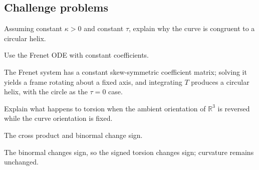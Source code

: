 \subsection*{Challenge problems}

\begin{exercise}\label{exr:vii13-ped-15}
Assuming constant \(\kappa>0\) and constant \(\tau\), explain why the curve is congruent to a circular helix.
\end{exercise}
\begin{hint}
Use the Frenet ODE with constant coefficients.
\end{hint}
\begin{solution}
The Frenet system has a constant skew-symmetric coefficient matrix; solving it yields a frame rotating about a fixed axis, and integrating \(T\) produces a circular helix, with the circle as the \(\tau=0\) case.
\end{solution}

\begin{exercise}\label{exr:vii13-ped-16}
Explain what happens to torsion when the ambient orientation of \(\mathbb R^3\) is reversed while the curve orientation is fixed.
\end{exercise}
\begin{hint}
The cross product and binormal change sign.
\end{hint}
\begin{solution}
The binormal changes sign, so the signed torsion changes sign; curvature remains unchanged.
\end{solution}


